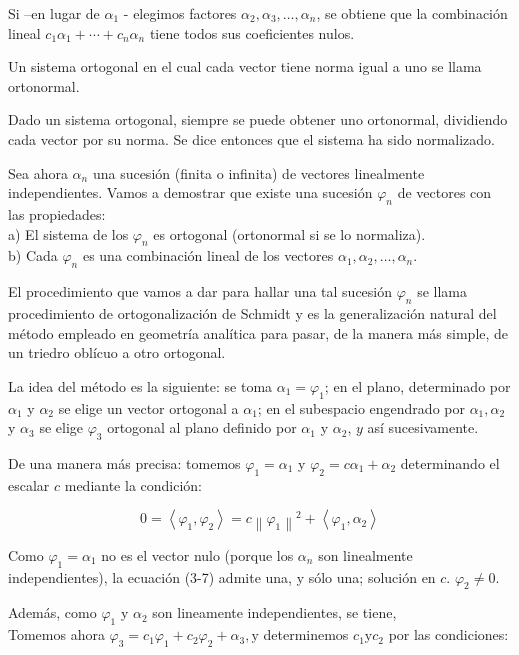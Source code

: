 \documentclass[10pt]{article}
\theoremstyle{plain}
\theoremstyle{definition}
\theoremstyle{remark}
\begin{document}
Si --en lugar de $\alpha_{1}$ - elegimos factores $\alpha_{2}, \alpha_{3}, \ldots, \alpha_{n}$, se obtiene que la combinación lineal $c_{1} \alpha_{1}+\cdots+c_{n} \alpha_{n}$ tiene todos sus coeficientes nulos.

Un sistema ortogonal en el cual cada vector tiene norma igual a uno se llama ortonormal.

Dado un sistema ortogonal, siempre se puede obtener uno ortonormal, dividiendo cada vector por su norma. Se dice entonces que el sistema ha sido normalizado.

Sea ahora $\alpha_{n}$ una sucesión (finita o infinita) de vectores linealmente independientes. Vamos a demostrar que existe una sucesión $\varphi_{n}$ de vectores con las propiedades:\\
a) El sistema de los $\varphi_{n}$ es ortogonal (ortonormal si se lo normaliza).\\
b) Cada $\varphi_{n}$ es una combinación lineal de los vectores $\alpha_{1}, \alpha_{2}, \ldots, \alpha_{n}$.

El procedimiento que vamos a dar para hallar una tal sucesión $\varphi_{n}$ se llama procedimiento de ortogonalización de Schmidt y es la generalización natural del método empleado en geometría analítica para pasar, de la manera más simple, de un triedro oblícuo a otro ortogonal.

La idea del método es la siguiente: se toma $\alpha_{1}=\varphi_{1}$; en el plano, determinado por $\alpha_{1}$ y $\alpha_{2}$ se elige un vector ortogonal a $\alpha_{1}$; en el subespacio engendrado por $\alpha_{1}, \alpha_{2}$ y $\alpha_{3}$ se elige $\varphi_{3}$ ortogonal al plano definido por $\alpha_{1}$ y $\alpha_{2}$, $y$ así sucesivamente.

De una manera más precisa: tomemos $\varphi_{1}=\alpha_{1}$ y $\varphi_{2}=c \alpha_{1}+\alpha_{2}$ determinando el escalar $c$ mediante la condición:


\begin{equation*}
0=\left\langle\varphi_{1}, \varphi_{2}\right\rangle=c\left\|\varphi_{1}\right\|^{2}+\left\langle\varphi_{1}, \alpha_{2}\right\rangle \tag{3-7}
\end{equation*}


Como $\varphi_{1}=\alpha_{1}$ no es el vector nulo (porque los $\alpha_{n}$ son linealmente independientes), la ecuación (3-7) admite una, y sólo una; solución en $c$. $\varphi_{2} \neq 0$.

Además, como $\varphi_{1}$ y $\alpha_{2}$ son lineamente independientes, se tiene,\\
Tomemos ahora $\varphi_{3}=c_{1} \varphi_{1}+c_{2} \varphi_{2}+\alpha_{3}, \mathrm{y}$ determinemos $c_{1} \mathrm{y} c_{2}$ por las condiciones:
\end{document}
